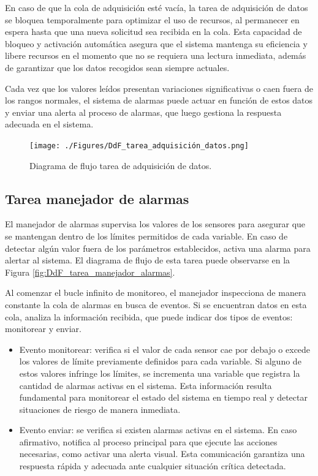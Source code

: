 En caso de que la cola de adquisición esté vacía, la tarea de adquisición de datos se bloquea temporalmente para optimizar el uso de recursos, al permanecer en espera hasta que una nueva solicitud sea recibida en la cola. Esta capacidad de bloqueo y activación automática asegura que el sistema mantenga su eficiencia y libere recursos en el momento que no se requiera una lectura inmediata, además de garantizar que los datos recogidos sean siempre actuales.

Cada vez que los valores leídos presentan variaciones significativas o caen fuera de los rangos normales, el sistema de alarmas puede actuar en función de estos datos y enviar una alerta al proceso de alarmas, que luego gestiona la respuesta adecuada en el sistema.

\newpage

\vspace{1cm}
\begin{figure}[htbp]
	\centering
	\texttt{[image: ./Figures/DdF\_tarea\_adquisición\_datos.png]}
	\caption{Diagrama de flujo tarea de adquisición de datos.}
	\label{fig:DdF_tarea_adquisición_datos}
\end{figure}
\vspace{1cm}

\subsection{Tarea manejador de alarmas}

El manejador de alarmas supervisa los valores de los sensores para asegurar que se mantengan dentro de los límites permitidos de cada variable. En caso de detectar algún valor fuera de los parámetros establecidos, activa una alarma para alertar al sistema. El diagrama de flujo de esta tarea puede observarse en la Figura \ref{fig:DdF_tarea_manejador_alarmas}.

Al comenzar el bucle infinito de monitoreo, el manejador inspecciona de manera constante la cola de alarmas en busca de eventos. Si se encuentran datos en esta cola, analiza la información recibida, que puede indicar dos tipos de eventos: monitorear y enviar.

\begin{itemize}
\item Evento monitorear: verifica si el valor de cada sensor cae por debajo o excede los valores de límite previamente definidos para cada variable. Si alguno de estos valores infringe los límites, se incrementa una variable que registra la cantidad de alarmas activas en el sistema. Esta información resulta fundamental para monitorear el estado del sistema en tiempo real y detectar situaciones de riesgo de manera inmediata.
\item Evento enviar: se verifica si existen alarmas activas en el sistema. En caso afirmativo, notifica al proceso principal para que ejecute las acciones necesarias, como activar una alerta visual. Esta comunicación garantiza una respuesta rápida y adecuada ante cualquier situación crítica detectada.
\end{itemize}

